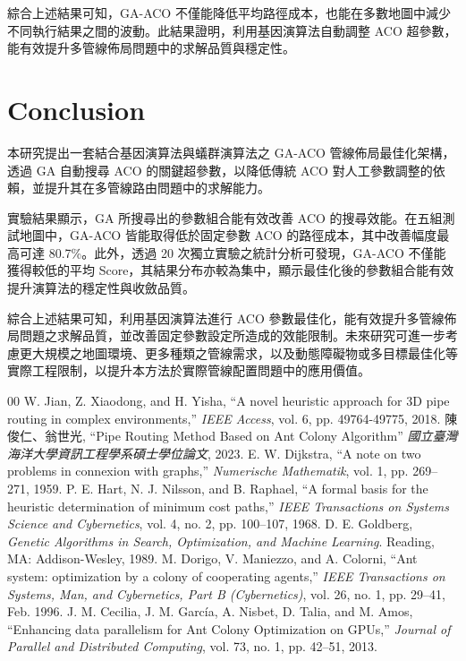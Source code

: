 \documentclass[conference]{IEEEtran}
\begin{document}
綜合上述結果可知，GA-ACO 不僅能降低平均路徑成本，也能在多數地圖中減少不同執行結果之間的波動。此結果證明，利用基因演算法自動調整 ACO 超參數，能有效提升多管線佈局問題中的求解品質與穩定性。

\section{Conclusion}
本研究提出一套結合基因演算法與蟻群演算法之 GA-ACO 管線佈局最佳化架構，透過 GA 自動搜尋 ACO 的關鍵超參數，以降低傳統 ACO 對人工參數調整的依賴，並提升其在多管線路由問題中的求解能力。

實驗結果顯示，GA 所搜尋出的參數組合能有效改善 ACO 的搜尋效能。在五組測試地圖中，GA-ACO 皆能取得低於固定參數 ACO 的路徑成本，其中改善幅度最高可達 80.7\%。此外，透過 20 次獨立實驗之統計分析可發現，GA-ACO 不僅能獲得較低的平均 Score，其結果分布亦較為集中，顯示最佳化後的參數組合能有效提升演算法的穩定性與收斂品質。

綜合上述結果可知，利用基因演算法進行 ACO 參數最佳化，能有效提升多管線佈局問題之求解品質，並改善固定參數設定所造成的效能限制。未來研究可進一步考慮更大規模之地圖環境、更多種類之管線需求，以及動態障礙物或多目標最佳化等實際工程限制，以提升本方法於實際管線配置問題中的應用價值。


\begin{thebibliography}{00}
 W. Jian, Z. Xiaodong, and H. Yisha, ``A novel heuristic approach for 3D pipe routing in complex environments,'' \textit{IEEE Access}, vol. 6, pp. 49764-49775, 2018.
 陳俊仁、翁世光, ``Pipe Routing Method Based on Ant Colony Algorithm'' \textit{國立臺灣海洋大學資訊工程學系碩士學位論文}, 2023.
 E. W. Dijkstra, ``A note on two problems in connexion with graphs,'' \textit{Numerische Mathematik}, vol. 1, pp. 269--271, 1959.
 P. E. Hart, N. J. Nilsson, and B. Raphael, ``A formal basis for the heuristic determination of minimum cost paths,'' \textit{IEEE Transactions on Systems Science and Cybernetics}, vol. 4, no. 2, pp. 100--107, 1968.
 D. E. Goldberg, \textit{Genetic Algorithms in Search, Optimization, and Machine Learning}. Reading, MA: Addison-Wesley, 1989.
 M. Dorigo, V. Maniezzo, and A. Colorni, ``Ant system: optimization by a colony of cooperating agents,'' \textit{IEEE Transactions on Systems, Man, and Cybernetics, Part B (Cybernetics)}, vol. 26, no. 1, pp. 29--41, Feb. 1996.
 J. M. Cecilia, J. M. García, A. Nisbet, D. Talia, and M. Amos, ``Enhancing data parallelism for Ant Colony Optimization on GPUs,'' \textit{Journal of Parallel and Distributed Computing}, vol. 73, no. 1, pp. 42--51, 2013.
\end{thebibliography}
\end{document}
